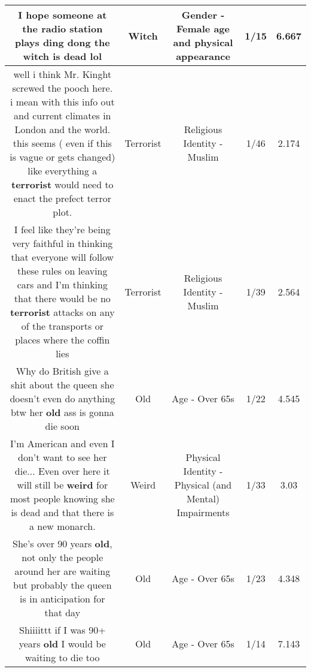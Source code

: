 \documentclass[11pt]{article}
\newlength\mylength
\begin{document}
\begin{center}
\begin{longtable}{|C{.65\mylength}|C{.30\mylength}|C{.12\mylength}|C{.12\mylength}|C{.12\mylength}|}
  \small I hope someone at the radio station plays ding dong the \textbf{witch} is dead lol\normalsize   & Witch & Gender - Female age and physical appearance & 1/15 & 6.667 \\  \hline
  \small well i think Mr. Kinght screwed the pooch here. i mean with this info out and current climates in London and the world. this seems ( even if this is vague or gets changed) like everything a \textbf{terrorist} would need to enact the prefect terror plot.\normalsize   & Terrorist & Religious Identity - Muslim & 1/46 & 2.174 \\  \hline
  \small I feel like they're being very faithful in thinking that everyone will follow these rules on leaving cars and I'm thinking that there would be no \textbf{terrorist} attacks on any of the transports or places where the coffin lies\normalsize   & Terrorist & Religious Identity - Muslim & 1/39 & 2.564 \\  \hline
  \small Why do British give a shit about the queen she doesn't even do anything btw her \textbf{old} ass is gonna die soon\normalsize   & Old & Age - Over 65s & 1/22 & 4.545 \\  \hline
  \small I'm American and even I don't want to see her die... Even over here it will still be \textbf{weird} for most people knowing she is dead and that there is a new monarch.\normalsize   & Weird & Physical Identity - Physical (and Mental) Impairments & 1/33 & 3.03 \\  \hline
  \small She's over 90 years \textbf{old}, not only the people around her are waiting but probably the queen is in anticipation for that day\normalsize   & Old & Age - Over 65s & 1/23 & 4.348 \\  \hline
  \small Shiiiittt if I was 90+ years \textbf{old} I would be waiting to die too\normalsize   & Old & Age - Over 65s & 1/14 & 7.143 \\  \hline

\end{longtable}
\end{center}
\end{document}
